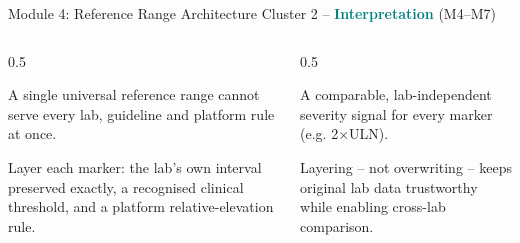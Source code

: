 \documentclass[9pt,aspectratio=169]{beamer}
\begin{document}
\begin{frame}{Module 4: Reference Range Architecture}
\textcolor{black!55}{\scriptsize Cluster 2 -- \textcolor{teal}{\textbf{Interpretation}} (M4--M7)}\\[2pt]
\begin{columns}[T,onlytextwidth]
\begin{column}{0.5\textwidth}
\begin{tcolorbox}[colback=blue!7,colframe=blue!55!black,title=\textbf{Motivation},boxrule=0.6pt,arc=1mm,left=5pt,right=5pt,top=3pt,bottom=3pt,fonttitle=\small]
\footnotesize A single universal reference range cannot serve every lab, guideline and platform rule at once.
\end{tcolorbox}
\vspace{5pt}
\begin{tcolorbox}[colback=teal!7,colframe=teal!55!black,title=\textbf{Method},boxrule=0.6pt,arc=1mm,left=5pt,right=5pt,top=3pt,bottom=3pt,fonttitle=\small]
\footnotesize Layer each marker: the lab's own interval preserved exactly, a recognised clinical threshold, and a platform relative-elevation rule.
\end{tcolorbox}
\end{column}
\begin{column}{0.5\textwidth}
\begin{tcolorbox}[colback=green!8,colframe=green!45!black,title=\textbf{Result},boxrule=0.6pt,arc=1mm,left=5pt,right=5pt,top=3pt,bottom=3pt,fonttitle=\small]
\footnotesize A comparable, lab-independent severity signal for every marker (e.g. 2$\times$ULN).
\end{tcolorbox}
\vspace{5pt}
\begin{tcolorbox}[colback=orange!10,colframe=orange!65!black,title=\textbf{Conclusion},boxrule=0.6pt,arc=1mm,left=5pt,right=5pt,top=3pt,bottom=3pt,fonttitle=\small]
\footnotesize Layering -- not overwriting -- keeps original lab data trustworthy while enabling cross-lab comparison.
\end{tcolorbox}
\end{column}
\end{columns}
\end{frame}
\end{document}
